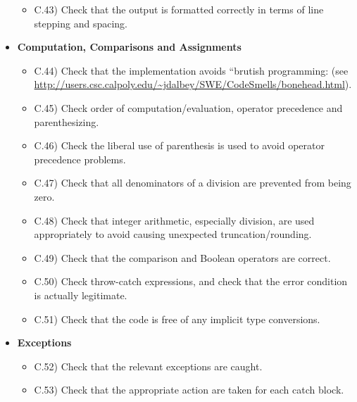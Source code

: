 \documentclass[../../codeInspection.tex]{subfiles}
\begin{document}
\begin{itemize}
\begin{itemize}
							\item C.43) Check that the output is formatted correctly in terms of line stepping and spacing.

						\end{itemize}

				\item 	\textbf{Computation, Comparisons and Assignments}
						\begin{itemize}

							\item C.44) Check that the implementation avoids “brutish programming: (see \url{http://users.csc.calpoly.edu/~jdalbey/SWE/CodeSmells/bonehead.html}).

							\item C.45) Check order of computation/evaluation, operator precedence and parenthesizing.

							\item C.46) Check the liberal use of parenthesis is used to avoid operator precedence problems.

							\item C.47) Check that all denominators of a division are prevented from being zero.

							\item C.48) Check that integer arithmetic, especially division, are used appropriately to avoid causing unexpected truncation/rounding.

							\item C.49) Check that the comparison and Boolean operators are correct.

							\item C.50) Check throw-catch expressions, and check that the error condition is actually legitimate.

							\item C.51) Check that the code is free of any implicit type conversions.

						\end{itemize}

				\item 	\textbf{Exceptions}
						\begin{itemize}

							\item C.52) Check that the relevant exceptions are caught.

							\item C.53) Check that the appropriate action are taken for each catch block.

						\end{itemize}


\end{itemize}
\end{document}
